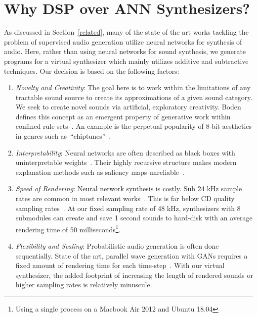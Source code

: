 \documentclass[\main/thesis.tex]{subfiles}
\begin{document}
\section{Why DSP over ANN Synthesizers?}
 As discussed in Section~\ref{related}, many of the state of the art works tackling the problem of supervised audio generation utilize neural networks for synthesis of audio. Here, rather than using neural networks for sound synthesis, we generate programs for a virtual synthesizer which mainly utilizes additive and subtractive techniques. Our decision is based on the following factors:
\begin{enumerate}[label=(\roman*)]
    \item \textit{Novelty and Creativity}: The goal here is to work within the limitations of any tractable sound source to create its approximations of a given sound category. We seek to create novel sounds via artificial, exploratory creativity. Boden defines this concept as an emergent property of generative work within confined rule sets~\cite{boden2009computer}. An example is the perpetual popularity of 8-bit aesthetics in genres such as~\enquote{chiptunes}~\cite{collins2007loop}. 
    \item \textit{Interpretability}: Neural networks are often described as black boxes with uninterpretable weights~\cite{basheer2000artificial}. Their highly recursive structure makes modern explanation methods such as saliency maps unreliable~\cite{rudin2019stop}.  
    \item \textit{Speed of Rendering}: Neural network synthesis is costly. Sub 24 kHz sample rates are common in most relevant works~\cite{yamamoto2020parallel,oord2017parallel,aouameur2019neural,ramires2020neural}. This is far below CD quality sampling rates~\cite{reiss2016meta}. At our fixed sampling rate of 48 kHz, synthesizers with 8 submodules can create and save 1 second sounds to hard-disk with an average rendering time of 50 milliseconds\footnote{Using a single process on a Macbook Air 2012 and Ubuntu 18.04}. 
    \item \textit{Flexibility and Scaling}: Probabilistic audio generation is often done sequentially. State of the art, parallel wave generation with GANs requires a fixed amount of rendering time for each time-step~\cite{yamamoto2020parallel}. With our virtual synthesizer, the added footprint of increasing the length of rendered sounds or higher sampling rates is relatively minuscule.  
\end{enumerate}
\end{document}
